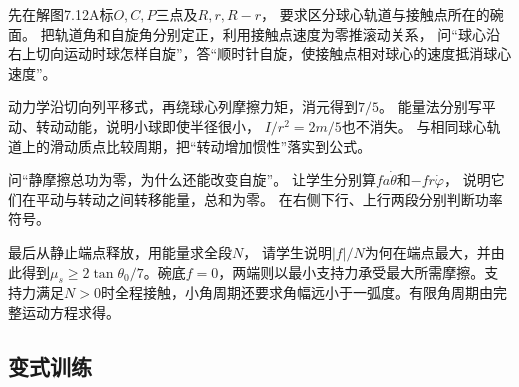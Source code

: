 \documentclass[UTF8,fontset=fandol,a4paper,11pt]{ctexart}
\begin{document}
先在解图7.12A标$O,C,P$三点及$R,r,R-r$，
要求区分球心轨道与接触点所在的碗面。
把轨道角和自旋角分别定正，利用接触点速度为零推滚动关系，
问“球心沿右上切向运动时球怎样自旋”，答“顺时针自旋，使接触点相对球心的速度抵消球心速度”。

动力学沿切向列平移式，再绕球心列摩擦力矩，消元得到$7/5$。
能量法分别写平动、转动动能，说明小球即使半径很小，
$I/r^2=2m/5$也不消失。
与相同球心轨道上的滑动质点比较周期，把“转动增加惯性”落实到公式。

问“静摩擦总功为零，为什么还能改变自旋”。
让学生分别算$f a\dot\theta$和$-fr\dot\varphi$，
说明它们在平动与转动之间转移能量，总和为零。
在右侧下行、上行两段分别判断功率符号。

最后从静止端点释放，用能量求全段$N$，
请学生说明$|f|/N$为何在端点最大，并由此得到$\mu_s\ge2\tan\theta_0/7$。碗底$f=0$，两端则以最小支持力承受最大所需摩擦。支持力满足$N>0$时全程接触，小角周期还要求角幅远小于一弧度。有限角周期由完整运动方程求得。




\subsection*{变式训练}
\end{document}
